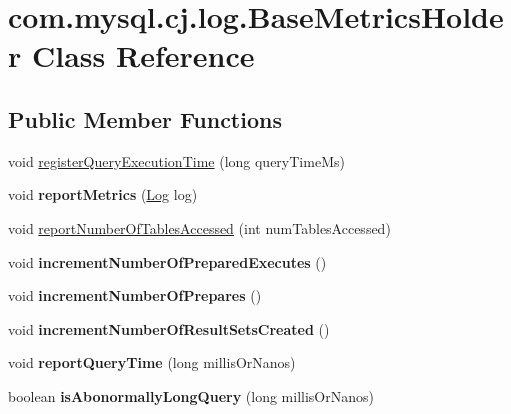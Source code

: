 \hypertarget{classcom_1_1mysql_1_1cj_1_1log_1_1_base_metrics_holder}{}\section{com.\+mysql.\+cj.\+log.\+Base\+Metrics\+Holder Class Reference}
\label{classcom_1_1mysql_1_1cj_1_1log_1_1_base_metrics_holder}
\subsection*{Public Member Functions}
\begin{DoxyCompactItemize}
\item 
void \mbox{\hyperlink{classcom_1_1mysql_1_1cj_1_1log_1_1_base_metrics_holder_a4f2787da929ecc62efd5a93acda4ba58}{register\+Query\+Execution\+Time}} (long query\+Time\+Ms)
\item 
\mbox{\label{classcom_1_1mysql_1_1cj_1_1log_1_1_base_metrics_holder_ab7fb39a092cd81f015cc3c3d4eac9846}} 
void {\bfseries report\+Metrics} (\mbox{\hyperlink{interfacecom_1_1mysql_1_1cj_1_1log_1_1_log}{Log}} log)
\item 
void \mbox{\hyperlink{classcom_1_1mysql_1_1cj_1_1log_1_1_base_metrics_holder_a75061da20b187347e1bd4d07e0c7db34}{report\+Number\+Of\+Tables\+Accessed}} (int num\+Tables\+Accessed)
\item 
\mbox{\label{classcom_1_1mysql_1_1cj_1_1log_1_1_base_metrics_holder_a8f77e2819880c83046e9ce70805eca81}} 
void {\bfseries increment\+Number\+Of\+Prepared\+Executes} ()
\item 
\mbox{\label{classcom_1_1mysql_1_1cj_1_1log_1_1_base_metrics_holder_a64a51a4972740262da8c2f4ccbe2b23d}} 
void {\bfseries increment\+Number\+Of\+Prepares} ()
\item 
\mbox{\label{classcom_1_1mysql_1_1cj_1_1log_1_1_base_metrics_holder_a9810296c9d133eba09bf2b9677e63b88}} 
void {\bfseries increment\+Number\+Of\+Result\+Sets\+Created} ()
\item 
\mbox{\label{classcom_1_1mysql_1_1cj_1_1log_1_1_base_metrics_holder_a46e6e0b9a7b352ab1ed37dea9d193913}} 
void {\bfseries report\+Query\+Time} (long millis\+Or\+Nanos)
\item 
\mbox{\label{classcom_1_1mysql_1_1cj_1_1log_1_1_base_metrics_holder_abe821df45163288d358e3b60a65c9fe5}} 
boolean {\bfseries is\+Abonormally\+Long\+Query} (long millis\+Or\+Nanos)
\end{DoxyCompactItemize}


